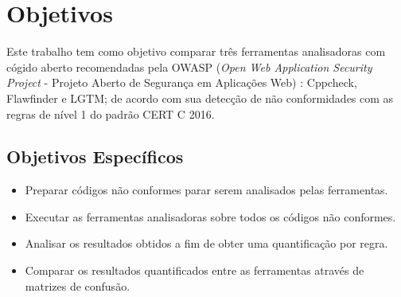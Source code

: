 \section{Objetivos}

Este trabalho tem como objetivo comparar três ferramentas analisadoras com cógido aberto recomendadas pela OWASP (\textit{Open Web Application Security Project} - Projeto Aberto de Segurança em Aplicações Web) \cite{owaspscat}: Cppcheck, Flawfinder e LGTM; de acordo com sua detecção de não conformidades com as regras de nível 1 do padrão CERT C 2016.

\subsection{Objetivos Específicos}
\begin{itemize}
  \item Preparar códigos não conformes parar serem analisados pelas ferramentas.
  \item Executar as ferramentas analisadoras sobre todos os códigos não conformes.
  \item Analisar os resultados obtidos a fim de obter uma quantificação por regra.
  \item Comparar os resultados quantificados entre as ferramentas através de matrizes de confusão.
\end{itemize}

